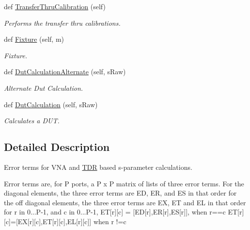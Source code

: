 \begin{DoxyCompactItemize}
def \hyperlink{classSignalIntegrity_1_1Measurement_1_1Calibration_1_1ErrorTerms_1_1ErrorTerms_ac22781b57de46a1993aaaf0104cb2331}{Transfer\+Thru\+Calibration} (self)
\begin{DoxyCompactList}\small\item\em Performs the transfer thru calibrations. \end{DoxyCompactList}\item 
def \hyperlink{classSignalIntegrity_1_1Measurement_1_1Calibration_1_1ErrorTerms_1_1ErrorTerms_a7df5e396b9b1e7d1a8ac4d549a729494}{Fixture} (self, m)
\begin{DoxyCompactList}\small\item\em Fixture. \end{DoxyCompactList}\item 
def \hyperlink{classSignalIntegrity_1_1Measurement_1_1Calibration_1_1ErrorTerms_1_1ErrorTerms_aaa197534b553fe80ed41db445147cbc3}{Dut\+Calculation\+Alternate} (self, s\+Raw)
\begin{DoxyCompactList}\small\item\em Alternate Dut Calculation. \end{DoxyCompactList}\item 
def \hyperlink{classSignalIntegrity_1_1Measurement_1_1Calibration_1_1ErrorTerms_1_1ErrorTerms_ac257ff0d436f9c02507349f82ece9e56}{Dut\+Calculation} (self, s\+Raw)
\begin{DoxyCompactList}\small\item\em Calculates a D\+UT. \end{DoxyCompactList}\end{DoxyCompactItemize}


\subsection{Detailed Description}
Error terms for V\+NA and \hyperlink{namespaceSignalIntegrity_1_1Measurement_1_1TDR}{T\+DR} based s-\/parameter calculations. 

Error terms are, for P ports, a P x P matrix of lists of three error terms. For the diagonal elements, the three error terms are ED, ER, and ES in that order for the off diagonal elements, the three error terms are EX, ET and EL in that order for r in 0...P-\/1, and c in 0...P-\/1, ET\mbox{[}r\mbox{]}\mbox{[}c\mbox{]} = \mbox{[}ED\mbox{[}r\mbox{]},ER\mbox{[}r\mbox{]},ES\mbox{[}r\mbox{]}\mbox{]}, when r==c ET\mbox{[}r\mbox{]}\mbox{[}c\mbox{]}=\mbox{[}EX\mbox{[}r\mbox{]}\mbox{[}c\mbox{]},ET\mbox{[}r\mbox{]}\mbox{[}c\mbox{]},EL\mbox{[}r\mbox{]}\mbox{[}c\mbox{]}\mbox{]} when r !=c

